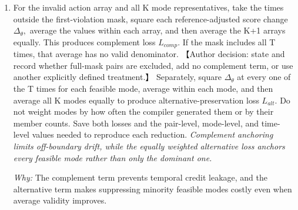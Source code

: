 \documentclass[10pt,a4paper]{article}
\begin{document}
\begin{enumerate}[leftmargin=*,start=4]
\par\emph{Why:} Reference adjustment isolates post-training movement, while the mask directs feasibility credit to the counterfactual’s implicated segment rather than the whole chunk.
  \item For the invalid action array and all K mode representatives, take the times outside the first-violation mask, square each reference-adjusted score change \(\Delta _\theta ,\) average the values within each array, and then average the K+1 arrays equally. This produces complement loss \(L_{comp}.\) If the mask includes all T times, that average has no valid denominator. 【Author decision: state and record whether full-mask pairs are excluded, add no complement term, or use another explicitly defined treatment.】 Separately, square \(\Delta _\theta \) at every one of the T times for each feasible mode, average within each mode, and then average all K modes equally to produce alternative-preservation loss \(L_{alt}.\) Do not weight modes by how often the compiler generated them or by their member counts. Save both losses and the pair-level, mode-level, and time-level values needed to reproduce each reduction.
\noindent\emph{Complement anchoring limits off-boundary drift, while the equally weighted alternative loss anchors every feasible mode rather than only the dominant one.}
\par{}
\par\emph{Why:} The complement term prevents temporal credit leakage, and the alternative term makes suppressing minority feasible modes costly even when average validity improves.
\end{enumerate}
\end{document}

